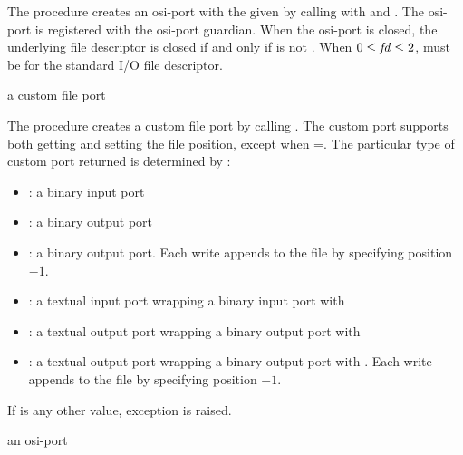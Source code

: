 The  procedure creates an osi-port with the given
 by calling  with  and
. The osi-port is registered with the osi-port
guardian. When the osi-port is closed, the
underlying file descriptor  is closed if and only if
 is not . When $0 \le \var{fd} \le 2$,
 must be  for the standard I/O file descriptor.

\begin{procedure}
\end{procedure}
\returns{} a custom file port

The  procedure creates a custom file port by calling
. The custom
port supports both getting and setting the file position, except when
=. The particular type of custom port returned
is determined by :
\begin{itemize}
  \item {}: a binary input port
  \item {}: a binary output port
  \item {}: a binary output port.
    Each write appends to the file by specifying position $-1$.
  \item {}: a textual input port wrapping a binary input
    port with 
  \item {}: a textual output port wrapping a binary
    output port with 
  \item {}: a textual output port wrapping a binary output
    port with . Each write appends to the file by
    specifying position $-1$.
\end{itemize}

If  is any other value, exception  is raised.

\begin{procedure}
\end{procedure}
\returns{} an osi-port

